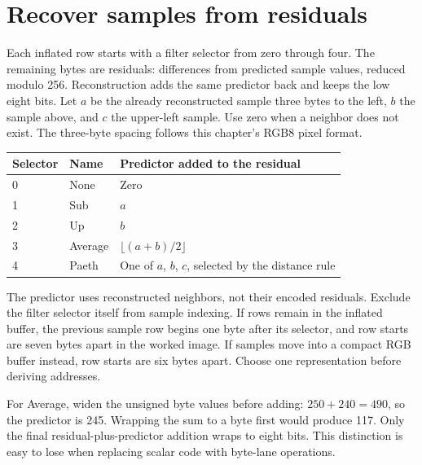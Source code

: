 \section{Recover samples from residuals}
Each inflated row starts with a filter selector from zero through four. The remaining
bytes are residuals: differences from predicted sample values, reduced modulo 256.
Reconstruction adds the same predictor back and keeps the low eight bits. Let $a$ be
the already reconstructed sample three bytes to the left, $b$ the sample above, and
$c$ the upper-left sample. Use zero when a neighbor does not exist. The three-byte
spacing follows this chapter's RGB8 pixel format.

\begin{longtable}{p{18mm}p{28mm}p{104mm}}
  \toprule Selector & Name    & Predictor added to the residual                     \\\midrule
  0                 & None    & Zero                                                \\
  1                 & Sub     & $a$                                                 \\
  2                 & Up      & $b$                                                 \\
  3                 & Average & $\lfloor(a+b)/2\rfloor$                             \\
  4                 & Paeth   & One of $a$, $b$, $c$, selected by the distance rule \\\bottomrule
\end{longtable}
The predictor uses reconstructed neighbors, not their encoded residuals. Exclude the
filter selector itself from sample indexing. If rows remain in the inflated buffer,
the previous sample row begins one byte after its selector, and row starts are seven
bytes apart in the worked image. If samples move into a compact RGB buffer instead,
row starts are six bytes apart. Choose one representation before deriving addresses.

For Average, widen the unsigned byte values before adding: $250+240=490$, so the
predictor is 245. Wrapping the sum to a byte first would produce 117. Only the final
residual-plus-predictor addition wraps to eight bits. This distinction is easy to lose
when replacing scalar code with byte-lane operations.
